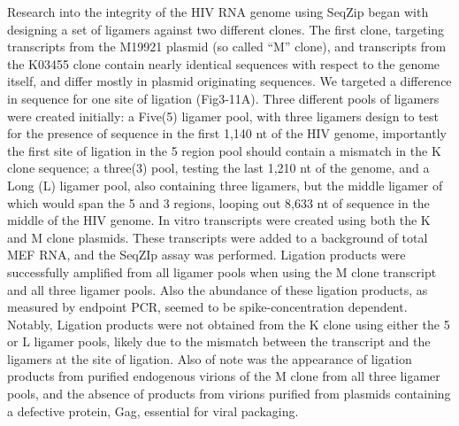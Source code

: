 	  Research into the integrity of the HIV RNA genome using SeqZip began with designing a set of ligamers against two different clones. The first clone, targeting transcripts from the M19921 plasmid (so called ``M'' clone), and transcripts from the K03455 clone contain nearly identical sequences with respect to the genome itself, and differ mostly in plasmid originating sequences. We targeted a difference in sequence for one site of ligation (Fig3-11A). Three different pools of ligamers were created initially: a Five(5) ligamer pool, with three ligamers design to test for the presence of sequence in the first 1,140 nt of the HIV genome, importantly the first site of ligation in the 5 region pool should contain a mismatch in the K clone sequence; a three(3) pool, testing the last 1,210 nt of the genome, and a Long (L) ligamer pool, also containing three ligamers, but the middle ligamer of which would span the 5 and 3 regions, looping out 8,633 nt of sequence in the middle of the HIV genome. In vitro transcripts were created using both the K and M clone plasmids. These transcripts were added to a background of total MEF RNA, and the SeqZIp assay was performed. Ligation products were successfully amplified from all ligamer pools when using the M clone transcript and all three ligamer pools. Also the abundance of these ligation products, as measured by endpoint PCR, seemed to be spike-concentration dependent. Notably, Ligation products were not obtained from the K clone using either the 5 or L ligamer pools, likely due to the mismatch between the transcript and the ligamers at the site of ligation. Also of note was the appearance of ligation products from purified endogenous virions of the M clone from all three ligamer pools, and the absence of products from virions purified from plasmids containing a defective protein, Gag, essential for viral packaging. 

